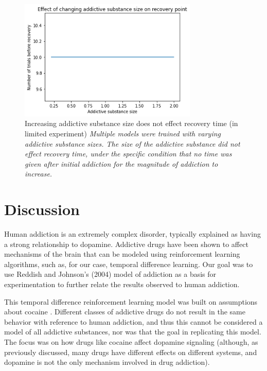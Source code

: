 \documentclass[10pt,letterpaper]{article}
\begin{document}
\begin{figure}[H]
   \centering
    \includegraphics[width = 85mm]{graphs/substance_recovery.png}
    \caption{Increasing addictive substance size does not effect recovery time (in limited experiment)
    \newline \emph{Multiple models were trained with varying addictive substance sizes. The size of the addictive substance did not effect recovery time, under the specific condition that no time was given after initial addiction for the magnitude of addiction to increase.}}
    \label{fig:Baseline}
\end{figure}


\section{Discussion}
Human addiction is an extremely complex disorder, typically explained as having a strong relationship to dopamine. Addictive drugs have been shown to affect mechanisms of the brain that can be modeled using reinforcement learning algorithms, such as, for our case, temporal difference learning. Our goal was to use Reddish and Johnson's (2004) model of addiction as a basis for experimentation to further relate the results observed to human addiction.

This temporal difference reinforcement learning model was built on assumptions about cocaine \cite{ReddishJohnson2004}. Different classes of addictive drugs do not result in the same behavior with reference to human addiction, and thus this cannot be considered a model of all addictive substances, nor was that the goal in replicating this model. The focus was on how drugs like cocaine affect dopamine signaling (although, as previously discussed, many drugs have different effects on different systems, and dopamine is not the only mechanism involved in drug addiction).
\end{document}
